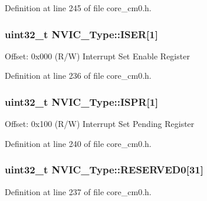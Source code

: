 Definition at line 245 of file core\+\_\+cm0.\+h.

\subsubsection[{\texorpdfstring{I\+S\+ER}{ISER}}]{ uint32\+\_\+t N\+V\+I\+C\+\_\+\+Type\+::\+I\+S\+ER\mbox{[}1\mbox{]}}\hypertarget{struct_n_v_i_c___type_a1f17e124416ac253386a3e3a339adebf}{}\label{struct_n_v_i_c___type_a1f17e124416ac253386a3e3a339adebf}
Offset\+: 0x000 (R/W) Interrupt Set Enable Register 

Definition at line 236 of file core\+\_\+cm0.\+h.

\subsubsection[{\texorpdfstring{I\+S\+PR}{ISPR}}]{ uint32\+\_\+t N\+V\+I\+C\+\_\+\+Type\+::\+I\+S\+PR\mbox{[}1\mbox{]}}\hypertarget{struct_n_v_i_c___type_ae6195c2f637c22c97d01ca5c71305bc3}{}\label{struct_n_v_i_c___type_ae6195c2f637c22c97d01ca5c71305bc3}
Offset\+: 0x100 (R/W) Interrupt Set Pending Register 

Definition at line 240 of file core\+\_\+cm0.\+h.

\subsubsection[{\texorpdfstring{R\+E\+S\+E\+R\+V\+E\+D0}{RESERVED0}}]{\setlength{\rightskip}{0pt plus 5cm}uint32\+\_\+t N\+V\+I\+C\+\_\+\+Type\+::\+R\+E\+S\+E\+R\+V\+E\+D0\mbox{[}31\mbox{]}}\hypertarget{struct_n_v_i_c___type_a52b6b330b9662b8e8962afd2bc22eab2}{}\label{struct_n_v_i_c___type_a52b6b330b9662b8e8962afd2bc22eab2}


Definition at line 237 of file core\+\_\+cm0.\+h.

